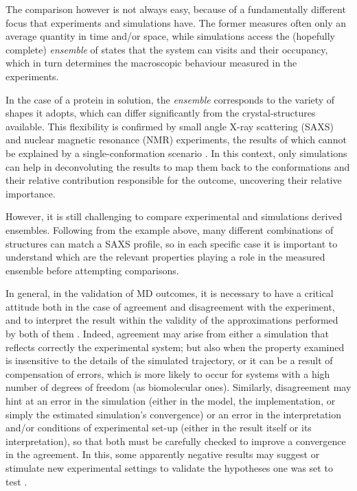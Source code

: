 The comparison however is not always easy, because of a fundamentally different focus that experiments and simulations have. The former measures often only an average quantity in time and/or space, while simulations access the (hopefully complete) \emph{ensemble} of states that the system can visits and their occupancy, which in turn determines the macroscopic behaviour measured in the experiments.

In the case of a protein in solution, the \emph{ensemble} corresponds to the variety of shapes it adopts, which can differ significantly from the crystal-structures available. This flexibility is confirmed by small angle X-ray scattering (SAXS) and nuclear magnetic resonance (NMR) experiments, the results of which cannot be explained by a single-conformation scenario \cite{Bonomi2017,Kikhney2015,Kleckner2011}. In this context, only simulations can help in deconvoluting the results to map them back to the conformations and their relative contribution responsible for the outcome, uncovering their relative importance.

However, it is still challenging to compare experimental and simulations derived ensembles. Following from the example above, many different combinations of structures can match a SAXS profile, so in each specific case it is important to understand which are the relevant properties playing a role in the measured ensemble before attempting comparisons.

In general, in the validation of MD outcomes, it is necessary to have a critical attitude both in the case of agreement and disagreement with the experiment, and to interpret the result within the validity of the approximations performed by both of them \cite{VanGunsteren2008}.
%
Indeed, agreement may arise from either a simulation that reflects correctly the experimental system; but also when the property examined is insensitive to the details of the simulated trajectory, or it can be a result of compensation of errors, which is more likely to occur for systems with a high number of degrees of freedom (as biomolecular ones).
%
Similarly, disagreement may hint at an error in the simulation (either in the model, the implementation, or simply the estimated simulation's convergence) or an error in the interpretation and/or conditions of experimental set-up (either in the result itself or its interpretation), so that both must be carefully checked to improve a convergence in the agreement.
%
In this, some apparently negative results may suggest or stimulate new experimental settings to validate the hypotheses one was set to test \cite{Goncalves2013,Meissner2014}.

